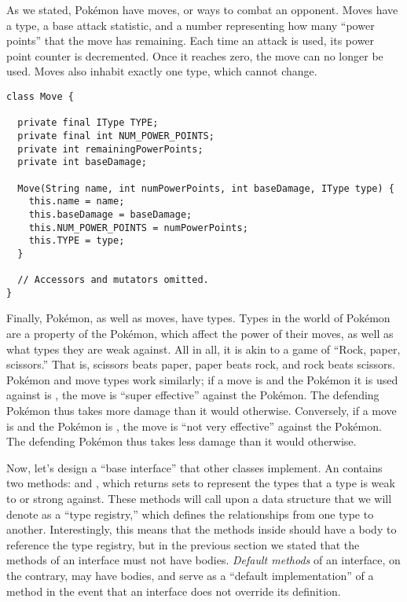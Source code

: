 As we stated, Pok\'emon have moves, or ways to combat an opponent. Moves have a type, a base attack statistic, and a number representing how many ``power points'' that the move has remaining. Each time an attack is used, its power point counter is decremented. Once it reaches zero, the move can no longer be used. Moves also inhabit exactly one type, which cannot change.

\begin{lstlisting}[language=MyJava]
class Move {

  private final IType TYPE;
  private final int NUM_POWER_POINTS;
  private int remainingPowerPoints;
  private int baseDamage;

  Move(String name, int numPowerPoints, int baseDamage, IType type) {
    this.name = name;
    this.baseDamage = baseDamage;
    this.NUM_POWER_POINTS = numPowerPoints;
    this.TYPE = type;
  }

  // Accessors and mutators omitted.
}
\end{lstlisting}

Finally, Pok\'emon, as well as moves, have types. Types in the world of Pok\'emon are a property of the Pok\'emon, which affect the power of their moves, as well as what types they are weak against. All in all, it is akin to a game of ``Rock, paper, scissors.'' That is, scissors beats paper, paper beats rock, and rock beats scissors. Pok\'emon and move types work similarly; if a move is  and the Pok\'emon it is used against is , the move is ``super effective'' against the Pok\'emon. The defending Pok\'emon thus takes more damage than it would otherwise. Conversely, if a move is  and the Pok\'emon is , the move is ``not very effective'' against the Pok\'emon. The defending Pok\'emon thus takes less damage than it would otherwise. 

Now, let's design a ``base interface'' that other classes implement. An  contains two methods:  and , which returns sets to represent the types that a type is weak to or strong against. These methods will call upon a data structure that we will denote as a ``type registry,'' which defines the relationships from one type to another. Interestingly, this means that the methods inside  should have a body to reference the type registry, but in the previous section we stated that the methods of an interface must not have bodies. \emph{Default methods} of an interface, on the contrary, may have bodies, and serve as a ``default implementation'' of a method in the event that an interface does not override its definition.

